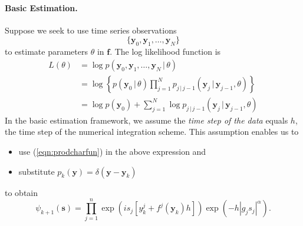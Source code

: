 \documentclass[12pt]{article}
\begin{document}
\paragraph{Basic Estimation.} Suppose we seek to use time series observations
\[
\{ \mathbf{y}_0, \mathbf{y}_1, \ldots, \mathbf{y}_N \}
\]
to estimate parameters $\theta$ in $\mathbf{f}$.  The log likelihood function is
\begin{align*}
L(\theta) &= \log p(  \mathbf{y}_0, \mathbf{y}_1, \ldots, \mathbf{y}_N \, | \, \theta ) \\
 &= \log \left\{ p(\mathbf{y}_0 \, | \, \theta) \prod_{j=1}^N p_{j \, | \, j-1}( \mathbf{y}_j \, | \, \mathbf{y}_{j-1}, \theta ) \right\} \\
 &= \log p(\mathbf{y}_0) + \sum_{j=1}^N \log p_{j \, | \, j-1}( \mathbf{y}_j \, | \, \mathbf{y}_{j-1}, \theta ) 
\end{align*}
In the basic estimation framework, we assume the \emph{time step of the data} equals $h$, the time step of the numerical integration scheme.  This assumption enables us to
\begin{itemize}
\item use (\ref{eqn:prodcharfun}) in the above expression and
\item substitute $p_k(\mathbf{y}) = \delta(\mathbf{y} - \mathbf{y}_k)$
\end{itemize}
to obtain
\[
\psi_{k+1}(\mathbf{s}) = \prod_{j=1}^n \exp\left( i s_j [y^j_k + f^j(\mathbf{y}_k) h] \right) \exp\left( -h |g_j s_j|^\alpha \right).
\]
\end{document}
